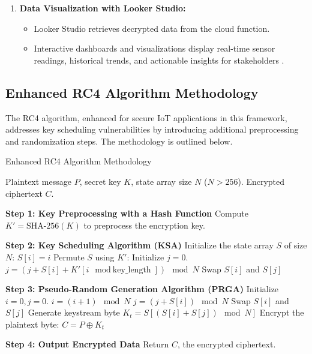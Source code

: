 \documentclass[journal]{Definitions/mdpi}
\begin{document}
\begin{enumerate}
\begin{itemize}
    \end{itemize}
    \item \textbf{Data Visualization with Looker Studio:}
    \begin{itemize}
        \item Looker Studio retrieves decrypted data from the cloud function.
        \item Interactive dashboards and visualizations display real-time sensor readings, historical trends, and actionable insights for stakeholders \cite{ref-cloud2}.
    \end{itemize}
\end{enumerate}

\subsection{Enhanced RC4 Algorithm Methodology}

The RC4 algorithm, enhanced for secure IoT applications in this framework, addresses key scheduling vulnerabilities by introducing additional preprocessing and randomization steps. The methodology is outlined below.

\begin{algorithm}[H]
\caption{Enhanced RC4 Algorithm Methodology}
\label{alg:EnhancedRC4}
\begin{algorithmic}[1]
\REQUIRE Plaintext message \( P \), secret key \( K \), state array size \( N \) (\( N > 256 \)).
\ENSURE Encrypted ciphertext \( C \).

\STATE \textbf{Step 1: Key Preprocessing with a Hash Function}
\STATE Compute \( K' = \text{SHA-256}(K) \) to preprocess the encryption key.

\STATE \textbf{Step 2: Key Scheduling Algorithm (KSA)}
\STATE Initialize the state array \( S \) of size \( N \):
    \STATE \( S[i] = i \)
\ENDFOR
\STATE Permute \( S \) using \( K' \):
\STATE Initialize \( j = 0 \).
    \STATE \( j = (j + S[i] + K'[i \mod \text{key\_length}]) \mod N \)
    \STATE Swap \( S[i] \) and \( S[j] \)
\ENDFOR

\STATE \textbf{Step 3: Pseudo-Random Generation Algorithm (PRGA)}
\STATE Initialize \( i = 0, j = 0 \).
    \STATE \( i = (i + 1) \mod N \)
    \STATE \( j = (j + S[i]) \mod N \)
    \STATE Swap \( S[i] \) and \( S[j] \)
    \STATE Generate keystream byte \( K_t = S[(S[i] + S[j]) \mod N] \)
    \STATE Encrypt the plaintext byte: \( C = P \oplus K_t \)
\ENDFOR

\STATE \textbf{Step 4: Output Encrypted Data}
\STATE Return \( C \), the encrypted ciphertext.
\end{algorithmic}
\end{algorithm}
\end{document}
